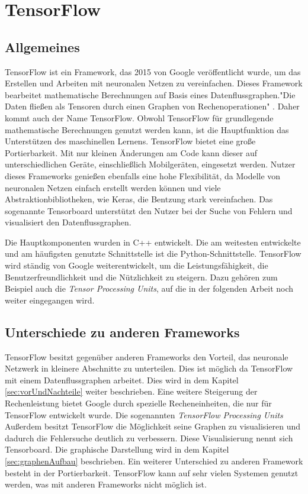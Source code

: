 \chapter{TensorFlow}
\label{chap:tensorflow}
\section{Allgemeines}
\label{sec:allgemeines}
\printsubchapterauthor{\authorNiklas}
TensorFlow ist ein Framework, das 2015 von Google veröffentlicht wurde, um das Erstellen und Arbeiten mit neuronalen Netzen zu vereinfachen. Dieses Framework bearbeitet mathematische Berechnungen auf Basis eines Datenflussgraphen."Die Daten fließen als Tensoren durch einen Graphen von Rechenoperationen" \citep{Einfuehrung}. Daher kommt auch der Name TensorFlow. Obwohl TensorFlow für grundlegende mathematische Berechnungen genutzt werden kann, ist die Hauptfunktion das Unterstützen des maschinellen Lernens. TensorFlow bietet eine große Portierbarkeit. Mit nur kleinen Änderungen am Code kann dieser auf unterschiedlichen Geräte, einschließlich Mobilgeräten, eingesetzt werden. Nutzer dieses Frameworks genießen ebenfalls eine hohe Flexibilität, da Modelle von neuronalen Netzen einfach erstellt werden können und viele Abstraktionbibliotheken, wie Keras, die Bentzung stark vereinfachen. Das sogenannte Tensorboard unterstützt den Nutzer bei der Suche von Fehlern und visualisiert den Datenflussgraphen. \cite{Einfuehrung} 

Die Hauptkomponenten wurden in C++ entwickelt. Die am weitesten entwickelte und am häufigsten genutzte Schnittstelle ist die Python-Schnittstelle. TensorFlow wird ständig von Google weiterentwickelt, um die Leistungsfähigkeit, die Benutzerfreundlichkeit und die Nützlichkeit zu steigern. Dazu gehören zum Beispiel auch die \textit{Tensor Processing Units}, auf die in der folgenden Arbeit noch weiter eingegangen wird.

\section{Unterschiede zu anderen Frameworks}
\label{sec:unterschiede}
\printsubchapterauthor{\authorNiklas}
TensorFlow besitzt gegenüber anderen Frameworks den Vorteil, das neuronale Netzwerk in kleinere Abschnitte zu unterteilen. Dies ist möglich da TensorFlow mit einem Datenflussgraphen arbeitet. Dies wird in dem Kapitel \ref{sec:vorUndNachteile} weiter beschrieben. Eine weitere Steigerung der Rechenleistung bietet Google durch spezielle Recheneinheiten, die nur für TensorFlow entwickelt wurde. Die sogenannten \textit{TensorFlow Processing Units} Außerdem besitzt TensorFlow die Möglichkeit seine Graphen zu visualisieren und dadurch die Fehlersuche deutlich zu verbessern. Diese Visualisierung nennt sich Tensorboard. Die graphische Darstellung wird in dem Kapitel \ref{sec:graphenAufbau} beschrieben. Ein weiterer Unterschied zu anderen Framework besteht in der Portierbarkeit. TensorFlow kann auf sehr vielen Systemen genutzt werden, was mit anderen Frameworks nicht möglich ist.
